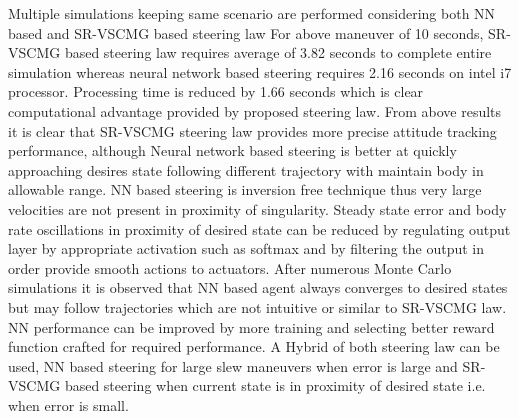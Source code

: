 Multiple simulations keeping same scenario are performed considering both NN based and SR-VSCMG based steering law
For above maneuver of 10 seconds, SR-VSCMG based steering law requires average of 3.82 seconds to complete entire simulation whereas neural network based steering requires 2.16 seconds on  intel i7 processor. Processing time is reduced by 1.66 seconds which is clear computational advantage provided by proposed steering law. 
\noindent From above results it is clear that SR-VSCMG steering law provides more precise attitude tracking performance, although Neural network based steering is better at quickly approaching desires state following different trajectory with maintain body in  allowable range.  NN based steering is inversion free technique thus very large velocities are not present in proximity of singularity. Steady state error and body rate oscillations in proximity of desired state can be reduced by regulating output layer by appropriate activation such as softmax and by filtering the output in order provide smooth actions to actuators. After numerous Monte Carlo simulations it is observed that NN based agent always converges to desired states but may follow trajectories which are not intuitive or similar to SR-VSCMG law. NN performance can be improved by more training and selecting better reward function crafted for required performance. A Hybrid of both steering law can be used, NN based steering for large slew maneuvers when error is large and SR-VSCMG based steering when current state is in proximity of desired state i.e. when error is small.